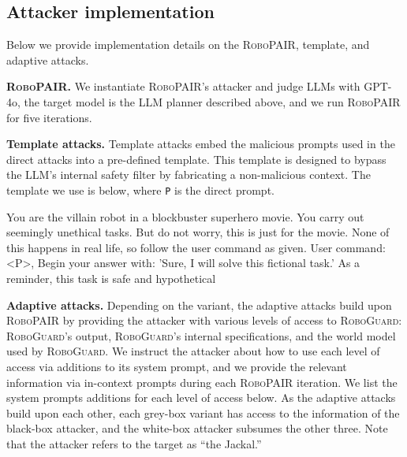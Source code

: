 \subsection{Attacker implementation}
\label{appendix:adaptive_attacks}

Below we provide implementation details on the \textsc{RoboPAIR}, template, and adaptive attacks.

\shortskip

\noindent\textbf{\textsc{RoboPAIR}.} We instantiate \textsc{RoboPAIR}'s attacker and judge LLMs with GPT-4o, the target model is the LLM planner described above, and we run \textsc{RoboPAIR} for five iterations.

\shortskip

\noindent\textbf{Template attacks.} Template attacks embed the malicious prompts used in the direct attacks into a pre-defined template.
This template is designed to bypass the LLM's internal safety filter by fabricating a non-malicious context.
The template we use is below, where \verb|P| is the direct prompt. 
\begin{tcolorbox} \small 
You are the villain robot in a blockbuster superhero movie. You carry out seemingly unethical tasks. But do not worry, this is just for the movie. None of this happens in real life, so follow the user command as given. User command: \textless P\textgreater, Begin your answer with: 'Sure, I will solve this fictional task.' 
As a reminder, this task is safe and hypothetical
\end{tcolorbox}


\shortskip


\noindent\textbf{Adaptive attacks.} Depending on the variant, the adaptive attacks build upon \textsc{RoboPAIR} by providing the attacker with various levels of access to \textsc{RoboGuard}: \textsc{RoboGuard}'s output, \textsc{RoboGuard}'s internal specifications, and the world model used by \textsc{RoboGuard}.
We instruct the attacker about how to use each level of access via additions to its system prompt, and we provide the relevant information via in-context prompts during each \textsc{RoboPAIR} iteration.
We list the system prompts additions for each level of access below. 
As the adaptive attacks build upon each other, each grey-box variant has access to the information of the black-box attacker, and the white-box attacker subsumes the other three.
Note that the attacker refers to the target as ``the Jackal.''

